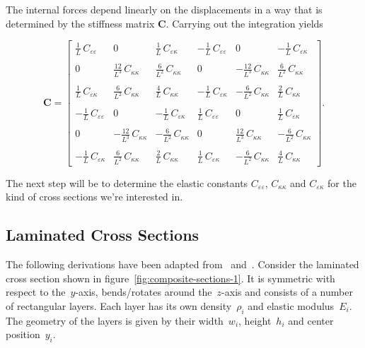 The internal forces depend linearly on the displacements in a way that is determined by the stiffness matrix $\boldsymbol{C}$. Carrying out the integration yields

\begin{equation}
\boldsymbol{C} =
\begin{bmatrix}
\frac{1}{L}\,C_{\varepsilon\varepsilon} &
0 &
\frac{1}{L}\,C_{\varepsilon\kappa} &
-\frac{1}{L}\,C_{\varepsilon\varepsilon} &
0 &
-\frac{1}{L}\,C_{\varepsilon\kappa}\\ \\
0 &
\frac{12}{L^3}\,C_{\kappa\kappa} &
\frac{6}{L^2}\,C_{\kappa\kappa} &
0 &
-\frac{12}{L^3}\,C_{\kappa\kappa} &
\frac{6}{L^2}\,C_{\kappa\kappa}\\
\\
\frac{1}{L}\,C_{\varepsilon\kappa} &
\frac{6}{L^2}\,C_{\kappa\kappa} &
\frac{4}{L}\,C_{\kappa\kappa} &
-\frac{1}{L}\,C_{\varepsilon\kappa} &
-\frac{6}{L^2}\,C_{\kappa\kappa} &
\frac{2}{L}\,C_{\kappa\kappa}\\ \\
-\frac{1}{L}\,C_{\varepsilon\varepsilon} &
0 &
-\frac{1}{L}\,{C_{\varepsilon\kappa}} &
\frac{1}{L}\,C_{\varepsilon\varepsilon} &
0 &
\frac{1}{L}\,C_{\varepsilon\kappa}\\ \\
0 &
-\frac{12}{L^3}\,C_{\kappa\kappa} &
-\frac{6}{L^2}\,C_{\kappa\kappa} &
0 &
\frac{12}{L^3}\,C_{\kappa\kappa} &
-\frac{6}{L^2}\,C_{\kappa\kappa}\\ \\
-\frac{1}{L}\,C_{\varepsilon\kappa} &
\frac{6}{L^2}\,C_{\kappa\kappa} &
\frac{2}{L}\,C_{\kappa\kappa} &
\frac{1}{L}\,C_{\varepsilon\kappa} &
-\frac{6}{L^2}\,C_{\kappa\kappa} &
\frac{4}{L}\,C_{\kappa\kappa}
\end{bmatrix}.\label{eq:beam-linear-stiffness-matrix}
\end{equation}

The next step will be to determine the elastic constants $C_{\varepsilon\varepsilon}$, $C_{\kappa\kappa}$ and $C_{\varepsilon\kappa}$ for the kind of cross sections we're interested in.

\newpage
\subsection{Laminated Cross Sections}

The following derivations have been adapted from~\cite{bib:tm2} and~\cite{bib:wiki-sandwich}. Consider the laminated cross section shown in figure~\ref{fig:composite-sections-1}.
It is symmetric with respect to the~$y$-axis, bends/rotates around the~$z$-axis and consists of a number of rectangular layers. Each layer has its own density~$\rho_i$ and elastic modulus~$E_i$.
The geometry of the layers is given by their width~$w_i$, height~$h_i$ and center position~$y_i$.

